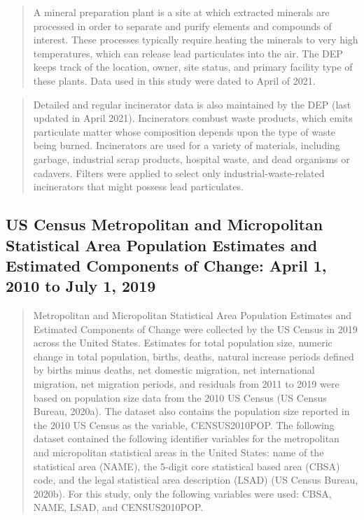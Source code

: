 \documentclass[
  12pt,
]{article}
\begin{document}
\begin{quote}
A mineral preparation plant is a site at which extracted minerals are
processed in order to separate and purify elements and compounds of
interest. These processes typically require heating the minerals to very
high temperatures, which can release lead particulates into the air. The
DEP keeps track of the location, owner, site status, and primary
facility type of these plants. Data used in this study were dated to
April of 2021.
\end{quote}

\begin{quote}
Detailed and regular incinerator data is also maintained by the DEP
(last updated in April 2021). Incinerators combust waste products, which
emits particulate matter whose composition depends upon the type of
waste being burned. Incinerators are used for a variety of materials,
including garbage, industrial scrap products, hospital waste, and dead
organisms or cadavers. Filters were applied to select only
industrial-waste-related incinerators that might possess lead
particulates.
\end{quote}

\hypertarget{us-census-metropolitan-and-micropolitan-statistical-area-population-estimates-and-estimated-components-of-change-april-1-2010-to-july-1-2019}{%
\subsection{US Census Metropolitan and Micropolitan Statistical Area
Population Estimates and Estimated Components of Change: April 1, 2010
to July 1,
2019}\label{us-census-metropolitan-and-micropolitan-statistical-area-population-estimates-and-estimated-components-of-change-april-1-2010-to-july-1-2019}}

\begin{quote}
Metropolitan and Micropolitan Statistical Area Population Estimates and
Estimated Components of Change were collected by the US Census in 2019
across the United States. Estimates for total population size, numeric
change in total population, births, deaths, natural increase periods
defined by births minus deaths, net domestic migration, net
international migration, net migration periods, and residuals from 2011
to 2019 were based on population size data from the 2010 US Census (US
Census Bureau, 2020a). The dataset also contains the population size
reported in the 2010 US Census as the variable, CENSUS2010POP. The
following dataset contained the following identifier variables for the
metropolitan and micropolitan statistical areas in the United States:
name of the statistical area (NAME), the 5-digit core statistical based
area (CBSA) code, and the legal statistical area description (LSAD) (US
Census Bureau, 2020b). For this study, only the following variables were
used: CBSA, NAME, LSAD, and CENSUS2010POP.
\end{quote}
\end{document}
